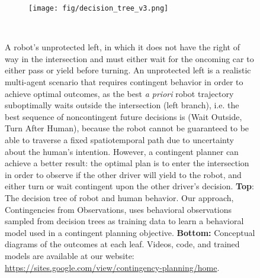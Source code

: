 \documentclass[conference]{IEEEtran}
\newcommand{\oursfull}[0]{{Contingencies from Observations}}
\begin{document}
\begin{figure}[t]
    \centering
    \begin{subfigure}[b]{\linewidth}
    \texttt{[image: fig/decision\_tree\_v3.png]}
    \end{subfigure} \\
        \caption{\small A robot's unprotected left, in which it does not have the right of way in the intersection and must either wait for the oncoming car to either pass or yield before turning. An unprotected left is a realistic multi-agent scenario that requires contingent behavior in order to achieve optimal outcomes, as the best \emph{a priori} robot trajectory suboptimally waits outside the intersection (left branch), i.e. the best sequence of noncontingent future decisions is (Wait Outside, Turn After Human), because the robot cannot be guaranteed to be able to traverse a fixed spatiotemporal path due to uncertainty about the human's intention. However, a contingent planner can achieve a better result: the optimal plan is to enter the intersection in order to observe if the other driver will yield to the robot, and either turn or wait contingent upon the other driver's decision. \textbf{Top}: The decision tree of robot and human behavior. Our approach, \oursfull, uses behavioral observations sampled from decision trees as training data to learn a behavioral model used in a contingent planning objective. \textbf{Bottom:} Conceptual diagrams of the outcomes at each leaf. Videos, code, and trained models are available at our website: {\small \url{https://sites.google.com/view/contingency-planning/home}}. }\label{fig:unprotected_left_didactic} 
        \vspace{-1.5em}
\end{figure}


\newcommand{\Prediction}[0]{\textcolor{orange!100}{Prediction}\xspace}
\newcommand{\Planning}[0]{\textcolor{blue!60}{Planning}\xspace}
\newlength{\graphsubfiglen}
\setlength{\graphsubfiglen}{.24\textwidth}
\newlength{\graphpiclen}
\setlength{\graphpiclen}{.6\graphsubfiglen}
\newcommand{\graphspace}{\hspace{0pt}}
\end{document}
